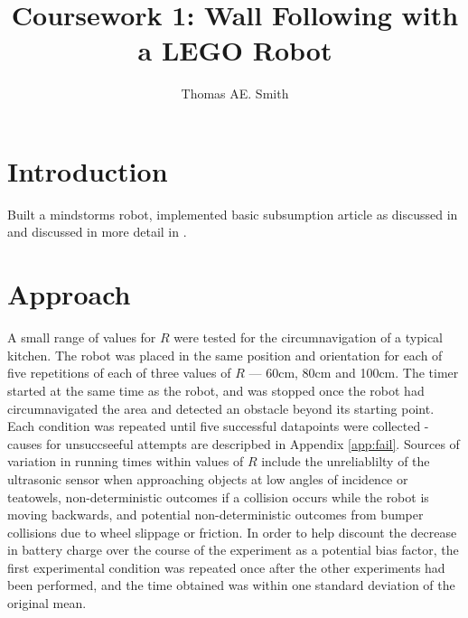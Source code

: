 \documentclass[a4paper,12pt]{article}
\title{Coursework 1:  Wall Following with a LEGO Robot}
\author{Thomas AE. Smith}
\begin{document}
\maketitle

\section{Introduction}


Built a mindstorms robot, implemented basic subsumption article as discussed in \citet{BrooksAIJ91} and discussed in more detail in \citet{brooks1986robust}.

\section{Approach}


A small range of values for $R$ were tested for the circumnavigation of a typical kitchen. The robot was placed in the same position and orientation for each of five repetitions of each of three values of $R$ --- 60cm, 80cm and 100cm. The timer started at the same time as the robot, and was stopped once the robot had circumnavigated the area and detected an obstacle beyond its starting point. Each condition was repeated until five successful datapoints were collected - causes for unsuccseeful attempts are descripbed in Appendix \ref{app:fail}.
Sources of variation in running times within values of $R$ include the unreliablilty of the ultrasonic sensor when approaching objects at low angles of incidence or teatowels, non-deterministic outcomes if a collision occurs while the robot is moving backwards, and potential non-deterministic outcomes from bumper collisions due to wheel slippage or friction. In order to help discount the decrease in battery charge over the course of the experiment as a potential bias factor, the first experimental condition was repeated once after the other experiments had been performed, and the time obtained was within one standard deviation of the original mean.
\end{document}
